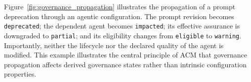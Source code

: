 \documentclass[10pt]{article}
\begin{document}
Figure~\ref{fig:governance_propagation} illustrates the propagation of a prompt
deprecation through an agentic configuration. The prompt revision becomes
\texttt{deprecated}; the dependent agent becomes \texttt{impacted}; its
effective assurance is downgraded to
\texttt{partial}; and its eligibility changes from
\texttt{eligible} to
\texttt{warning}. Importantly, neither the lifecycle nor the declared quality
of the agent is modified. This example illustrates the central principle of ACM
that governance propagation affects derived governance states rather than
intrinsic configuration properties.

%
%
%
\end{document}
